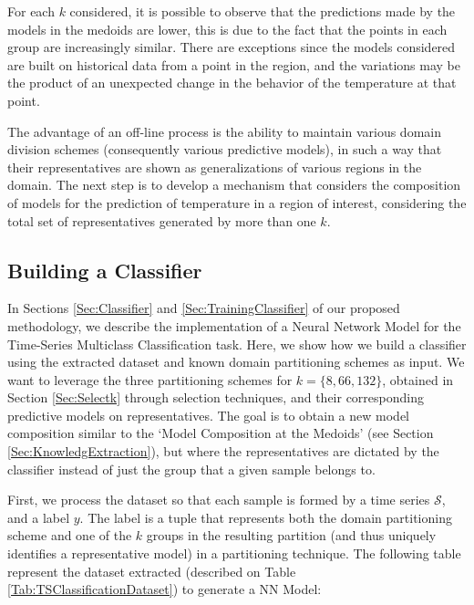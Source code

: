 For each $k$ considered, it is possible to observe that the predictions made by the models in the medoids are lower, this is due to the fact that the points in each group are increasingly similar. There are exceptions since the models considered are built on historical data from a point in the region, and the variations may be the product of an unexpected change in the behavior of the temperature at that point.

The advantage of an off-line process is the ability to maintain various domain division schemes (consequently various predictive models), in such a way that their representatives are shown as generalizations of various regions in the domain. The next step is to develop a mechanism that considers the composition of models for the prediction of temperature in a region of interest, considering the total set of representatives generated by more than one $k$. 

\subsection{Building a Classifier}
\label{Sec:ExperimentsTrainingClassifier}

In Sections \ref{Sec:Classifier} and \ref{Sec:TrainingClassifier} of our proposed methodology, we describe the implementation of a Neural Network Model for the Time-Series Multiclass Classification task. Here, we show how we build a classifier using the extracted dataset and known domain partitioning schemes as input. We want to leverage the three partitioning schemes for $k = \{8, 66, 132\}$, obtained in Section \ref{Sec:Selectk} through selection techniques, and their corresponding predictive models on representatives. The goal is to obtain a new model composition similar to the `Model Composition at the Medoids' (see Section \ref{Sec:KnowledgExtraction}), but where the representatives are dictated by the classifier instead of just the group that a given sample belongs to. 

First, we process the dataset so that each sample is formed by a time series $\mathcal{S}$, and a label $y$. The label is a tuple that represents both the domain partitioning scheme and one of the $k$ groups in the resulting partition (and thus uniquely identifies a representative model) in a partitioning technique.  %
The following table represent the dataset extracted (described on Table \ref{Tab:TSClassificationDataset}) to generate a NN Model:

